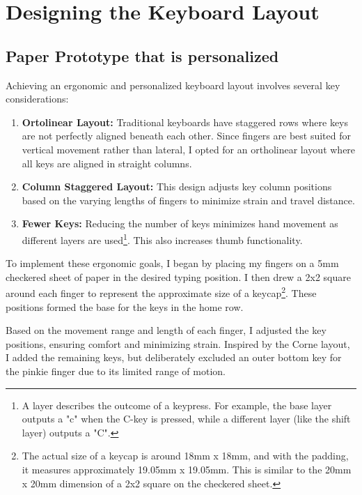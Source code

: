 \documentclass[a4paper,12pt]{article}
\begin{document}
\pagebreak

\section{Designing the Keyboard Layout}

\subsection{Paper Prototype that is personalized}

Achieving an ergonomic and personalized keyboard layout involves several key considerations:

\begin{enumerate}
    \item \textbf{Ortolinear Layout:} Traditional keyboards have staggered rows where keys are not perfectly aligned beneath each other. Since fingers are best suited for vertical movement rather than lateral, I opted for an ortholinear layout where all keys are aligned in straight columns.
    \item \textbf{Column Staggered Layout:} This design adjusts key column positions based on the varying lengths of fingers to minimize strain and travel distance.
    \item \textbf{Fewer Keys:} Reducing the number of keys minimizes hand movement as different layers are used\footnote{A layer describes the outcome of a keypress. For example, the base layer outputs a "c" when the C-key is pressed, while a different layer (like the shift layer) outputs a "C".}. This also increases thumb functionality.
\end{enumerate}

To implement these ergonomic goals, I began by placing my fingers on a 5mm checkered sheet of paper in the desired typing position. I then drew a 2x2 square around each finger to represent the approximate size of a keycap\footnote{The actual size of a keycap is around 18mm x 18mm, and with the padding, it measures approximately 19.05mm x 19.05mm. This is similar to the 20mm x 20mm dimension of a 2x2 square on the checkered sheet.}. These positions formed the base for the keys in the home row.

Based on the movement range and length of each finger, I adjusted the key positions, ensuring comfort and minimizing strain. Inspired by the Corne layout, I added the remaining keys, but deliberately excluded an outer bottom key for the pinkie finger due to its limited range of motion.
\end{document}
